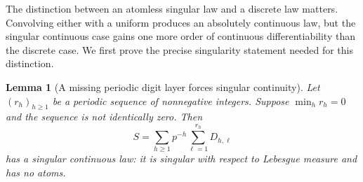 \documentclass[11pt,a4paper]{article}
\newtheorem{lemma}[theorem]{Lemma}
\theoremstyle{remark}
\begin{document}
The distinction between an atomless singular law and a discrete law matters.
Convolving either with a uniform produces an absolutely continuous law, but the
singular continuous case gains one more order of continuous differentiability
than the discrete case. We first prove the precise singularity statement needed
for this distinction.

\begin{lemma}[A missing periodic digit layer forces singular continuity]
\label{lem:periodic-singular}
Let $(r_h)_{h\ge1}$ be a periodic sequence of nonnegative integers. Suppose
$\min_h r_h=0$ and the sequence is not identically zero. Then
\begin{equation}
 S=\sum_{h\ge1}p^{-h}\sum_{\ell=1}^{r_h}D_{h,\ell}
 \label{eq:periodic-singular}
\end{equation}
has a singular continuous law: it is singular with respect to Lebesgue measure
and has no atoms.
\end{lemma}
\end{document}
